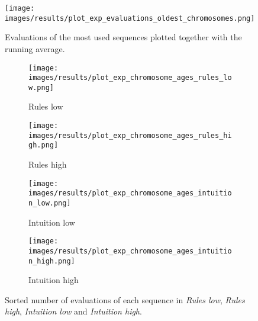 \begin{figure}[ht]
	\centering
	\texttt{[image: images/results/plot\_exp\_evaluations\_oldest\_chromosomes.png]}
	\caption{Evaluations of the most used sequences plotted together with 
		the running average.}
	\label{fig:exp_evals_oldest}
\end{figure}

\begin{figure}[ht]
	\begin{subfigure}{0.49\linewidth}
	\centering
	\texttt{[image: images/results/plot\_exp\_chromosome\_ages\_rules\_low.png]}
	\caption{Rules low}
	\label{fig:exp_age_rules_low}
	\end{subfigure}
	\hfill
	\begin{subfigure}{0.49\linewidth}
	\centering
	\texttt{[image: images/results/plot\_exp\_chromosome\_ages\_rules\_high.png]}
	\caption{Rules high}
	\label{fig:exp_age_rules_high}
	\end{subfigure}
	\begin{subfigure}{0.49\linewidth}
	\centering
	\texttt{[image: images/results/plot\_exp\_chromosome\_ages\_intuition\_low.png]}
	\caption{Intuition low}
	\label{fig:exp_age_intuition_low}
	\end{subfigure}
	\hfill
	\begin{subfigure}{0.49\linewidth}
	\centering
	\texttt{[image: images/results/plot\_exp\_chromosome\_ages\_intuition\_high.png]}
	\caption{Intuition high}
	\label{fig:exp_age_intuition_high}
	\end{subfigure}
	\caption{Sorted number of evaluations of each sequence in \emph{Rules
	low}, \emph{Rules high}, \emph{Intuition low} and \emph{Intuition high}.}
	\label{fig:exp_ages1}
\end{figure}

